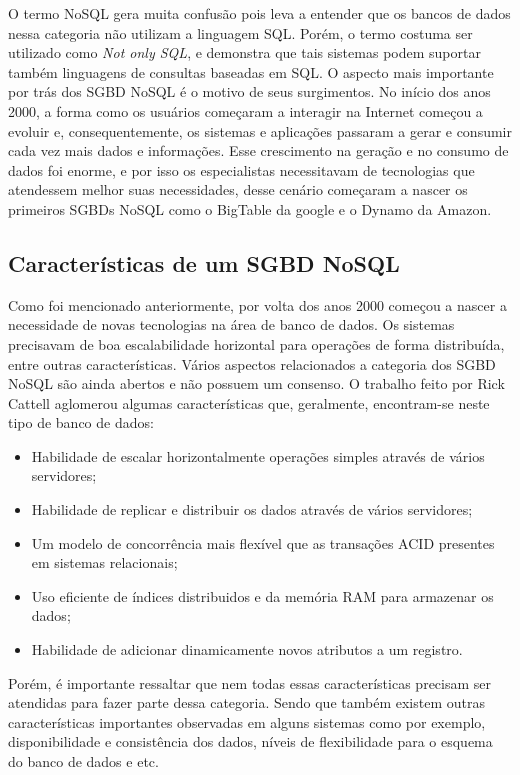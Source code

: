 	O termo NoSQL gera muita confusão pois leva a entender que os bancos de dados nessa categoria não utilizam a linguagem SQL. Porém, o termo costuma ser utilizado como \textit{Not only SQL}, e demonstra que tais sistemas podem suportar também linguagens de consultas baseadas em SQL. O aspecto mais importante por trás dos SGBD NoSQL é o motivo de seus surgimentos. No início dos anos 2000, a forma como os usuários começaram a interagir na Internet começou a evoluir e, consequentemente, os sistemas e aplicações passaram a gerar e consumir cada vez mais dados e informações. Esse crescimento na geração e no consumo de dados foi enorme, e por isso os especialistas necessitavam de tecnologias que atendessem melhor suas necessidades, desse cenário começaram a nascer os primeiros SGBDs NoSQL como o BigTable da google e o Dynamo da Amazon\cite{DeCandia:2007:DAH:1323293.1294281}.
	
\subsection{Características de um SGBD NoSQL}
	Como foi mencionado anteriormente, por volta dos anos 2000 começou a nascer a necessidade de novas tecnologias na área de banco de dados. Os sistemas precisavam de boa escalabilidade horizontal para operações de forma distribuída, entre outras características. Vários aspectos relacionados a categoria dos SGBD NoSQL são ainda abertos e não possuem um consenso. O trabalho feito por Rick Cattell \cite{Cattell:2011:SSN:1978915.1978919} aglomerou algumas características que, geralmente, encontram-se neste tipo de banco de dados: 
	\begin{itemize}
		\item Habilidade de escalar horizontalmente operações simples através de vários servidores;
		\item Habilidade de replicar e distribuir os dados através de vários servidores;
		\item Um modelo de concorrência mais flexível que as transações ACID presentes em sistemas relacionais;
		\item Uso eficiente de índices distribuidos e da memória RAM para armazenar os dados;
		\item Habilidade de adicionar dinamicamente novos atributos a um registro.
	\end{itemize}
	
	Porém, é importante ressaltar que nem todas essas características precisam ser atendidas para fazer parte dessa categoria. Sendo que também existem outras características importantes observadas em alguns sistemas como por exemplo, disponibilidade e consistência dos dados, níveis de flexibilidade para o esquema do banco de dados e etc.

